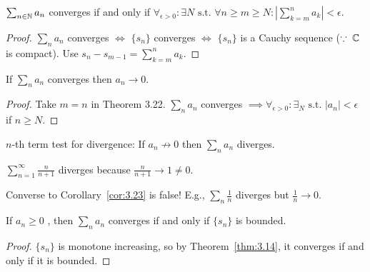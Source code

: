 \begin{theorem}
	$\sum_{n \in \mathbb{N}}{a_{n}}$ converges if and only if $\forall_{\epsilon >0}: \exists N \text{ s.t. }\forall{n\ge m\ge  N}: |\sum_{k=m}^{n}{a_{k}}| <\epsilon $.
	\begin{proof}
		$\sum_{n}{a_{n}}$ converges $\Leftrightarrow $ $\{ {s}_{n}\}$ converges $\Leftrightarrow$ $\{ {s}_{n}\}$ is a Cauchy sequence ($\because\; \mathbb{C}$ is compact). Use $s_{n}-s_{m-1}=\sum_{k=m}^{n}{a_k}$.
	\end{proof}
\end{theorem}
\begin{corollary}
	\label{cor:3.23}
	If $\sum_{n}{a_{n}}$ converges then $a_{n}\to 0$.
	\begin{proof}
		Take $m=n$ in Theorem 3.22. $\sum_{n}{a_{n}}$ converges $\implies \forall_{\epsilon > 0}: \exists_{N} \text{ s.t. } |a_{n}| <\epsilon $ if $n\ge N$.
	\end{proof}
	\begin{remark}
		$n$-th term test for divergence: If $a_{n}\not\to 0$ then $\sum_n{a_{n}}$ diverges.
		\begin{example}
			$\sum_{n=1}^{\infty }{\frac{n}{n+1}}$ diverges because $\frac{n}{n+1}\to 1\neq 0$.
		\end{example}
		Converse to Corollary~\ref{cor:3.23} is false! E.g., $\sum_{n}{\frac{1}{n}}$ diverges but $\frac{1}{n}\to 0$.
	\end{remark}
\end{corollary}

\begin{theorem}
	\label{thm:3.24}
	If $a_{n}\ge 0$ , then $\sum_{n}{a_{n}}$ converges if and only if $\{ {s}_{n}\}$ is bounded.
	\begin{proof}
		$\{ {s}_{n}\}$ is monotone increasing, so by Theorem~\ref{thm:3.14}, it converges if and only if it is bounded.
	\end{proof}
\end{theorem}

